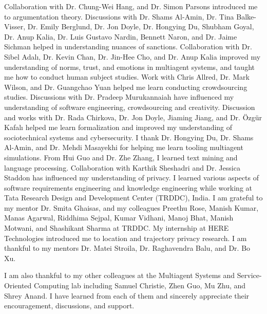 \begin{acknowledgements}
%
Collaboration with Dr. Chung-Wei Hang, and Dr. Simon Parsons introduced me to argumentation theory. 
Discussions with Dr. Shams Al-Amin, Dr. Tina Balke-Visser, Dr. Emily Berglund, Dr. Jon Doyle, Dr. Hongying Du, Shubham Goyal, Dr. Anup Kalia, Dr. Luis Gustavo Nardin, Bennett Naron, and Dr. Jaime Sichman helped in understanding nuances of sanctions. 
Collaboration with Dr. Sibel Adal{\i}, Dr. Kevin Chan, Dr. Jin-Hee Cho, and Dr. Anup Kalia improved my understanding of norms, trust, and emotions in multiagent systems, and taught me how to conduct human subject studies. Work with Chris Allred, Dr. Mark Wilson, and Dr. Guangchao Yuan helped me learn conducting crowdsourcing studies. 
Discussions with Dr. Pradeep Murukannaiah have influenced my understanding of software engineering, crowdsourcing and creativity.
Discussion and works with Dr. Rada Chirkova, Dr. Jon Doyle, Jiaming Jiang, and Dr. {\"O}zg{\"u}r Kafal{\i} helped me learn formalization and improved my understanding of sociotechnical systems and cybersecurity. I thank Dr. Hongying Du, Dr. Shams Al-Amin, and Dr. Mehdi Masayekhi for helping me learn tooling multiagent simulations. 
From Hui Guo and Dr. Zhe Zhang, I learned text mining and language processing. 
Collaboration with Karthik Sheshadri and Dr. Jessica Staddon has influenced my understanding of privacy. 
I learned various aspects of software requirements engineering and knowledge engineering while working at Tata Research Design and Development Center (TRDDC), India. I am grateful to my mentor Dr. Smita Ghaisas, and my colleagues Preethu Rose, Manish Kumar, Manas Agarwal, Riddhima Sejpal, Kumar Vidhani, Manoj Bhat, Manish Motwani, and Shashikant Sharma at TRDDC.
My internship at HERE Technologies introduced me to location and trajectory privacy research. I am thankful to my mentors Dr. Matei Stroila, Dr. Raghavendra Balu, and Dr. Bo Xu. 

I am also thankful to my other colleagues at the Multiagent Systems and Service-Oriented Computing lab including Samuel Christie, Zhen Guo, Mu Zhu, and Shrey Anand. I have learned from each of them and sincerely appreciate their encouragement, discussions, and support. 


\end{acknowledgements}
